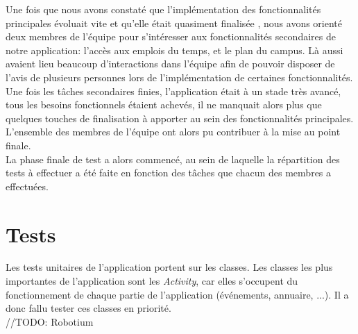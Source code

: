 Une fois que nous avons constaté que l’implémentation des fonctionnalités principales évoluait vite et qu’elle était quasiment finalisée , nous avons orienté deux membres de l’équipe pour s’intéresser aux fonctionnalités secondaires de notre application: l’accès aux emplois du temps, et le plan du campus. Là aussi avaient lieu beaucoup d'interactions dans l’équipe afin de pouvoir disposer de l’avis de plusieurs personnes lors de l’implémentation de certaines fonctionnalités.\\
Une fois les tâches secondaires finies, l’application était à un stade très avancé, tous les besoins fonctionnels  étaient achevés, il ne manquait alors plus que quelques touches de finalisation à apporter au sein des fonctionnalités principales. L’ensemble des membres de l’équipe ont alors pu contribuer à la mise au point finale.\\
La phase finale de test a alors commencé, au sein de laquelle la répartition des tests à effectuer a été faite en fonction des tâches que chacun des membres a effectuées.

\section{Tests}
Les tests unitaires de l’application portent sur les classes. Les classes les plus importantes de l’application sont les \emph{Activity}, car elles s’occupent du fonctionnement de chaque partie de l’application (événements, annuaire, ...). Il a donc fallu tester ces classes en priorité.\\
//TODO: Robotium